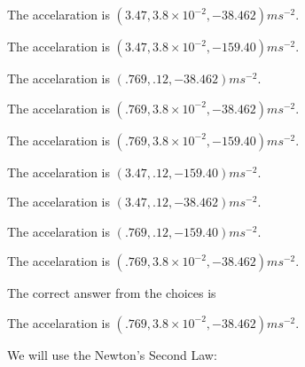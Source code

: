 \documentclass[12pt]{article}
\begin{document}
 
 
The accelaration is $  %
(
3.47,
3.8 \times 10^{-2},
-38.462)
ms^{-2} $.
 
 
The accelaration is $  %
(
3.47,
3.8 \times 10^{-2},
-159.40)
ms^{-2} $.
 
 
The accelaration is $  %
(
.769,
.12,
-38.462)
ms^{-2} $.
 
 
The accelaration is $  %
(
.769,
3.8 \times 10^{-2},
-38.462)
ms^{-2} $.
 
 
The accelaration is $  %
(
.769,
3.8 \times 10^{-2},
-159.40)
ms^{-2} $.
 
 
The accelaration is $  %
(
3.47,
.12,
-159.40)
ms^{-2} $.
 
 
The accelaration is $  %
(
3.47,
.12,
-38.462)
ms^{-2} $.
 
 
The accelaration is $  %
(
.769,
.12,
-159.40)
ms^{-2} $.
 
 
\noindent{}
 
 
The accelaration is $  %
(
.769,
3.8 \times 10^{-2},
-38.462)
ms^{-2} $.
 
 
\noindent{}
 
 
 
 
 
\noindent{}
 
 

The correct answer from the choices is


The accelaration is $  %
(
.769,
3.8 \times 10^{-2},
-38.462)
ms^{-2} $.
 
 
 
\noindent{}
 
 

 
 
 
\noindent{}
 
 

We will use the Newton's Second Law:
 
\end{document}
